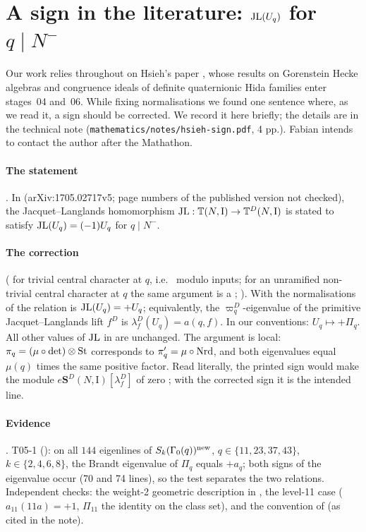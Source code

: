 \section{A sign in the literature: \texorpdfstring{$\mathrm{JL}(U_q)$}{JL(U\_q)} for \texorpdfstring{$q\mid N^-$}{q | N-}}\label{sec:hsieh}
Our work relies throughout on Hsieh's paper \cite{Hs}, whose results on Gorenstein Hecke algebras and congruence ideals of
definite quaternionic Hida families enter stages~04 and~06. While fixing normalisations we found one sentence where, as
we read it, a sign should be corrected. We record it here briefly; the details are in the technical note \cite{LLhsieh}
(\texttt{mathematics/notes/hsieh-sign.pdf}, 4 pp.). Fabian intends to contact the author after the Mathathon.

\paragraph{The statement} \stcited. In \cite[\S4.5, p.~34]{Hs} (arXiv:1705.02717v5; page numbers of the published version
not checked), the Jacquet--Langlands homomorphism $\mathrm{JL}:\mathbb{T}(N,\mathrm{I})\to\mathbb{T}^D(N,\mathrm{I})$ is stated to satisfy $\mathrm{JL}(U_q)=(-1)U_q$ for
$q\mid N^-$.

\paragraph{The correction} (\stpmc{} for trivial central character at $q$, i.e.\ \stproved{} modulo \stcited{} inputs; for an
unramified non-trivial central character at $q$ the same argument is a \stsketch; \cite[Prop.~2.1]{LLhsieh}). With the
normalisations of \cite{Hs} the relation is $\mathrm{JL}(U_q)=+U_q$; equivalently, the $\varpi^D_q$-eigenvalue of the primitive
Jacquet--Langlands lift $f^D$ is $\lambda^D_f(U_q)=a(q,f)$. In our conventions: $U_q\mapsto+\Pi_q$. All other values of $\mathrm{JL}$
in \cite[p.~34]{Hs} are unchanged. The argument is local: $\pi_q=(\mu\circ\det)\otimes\mathrm{St}$ corresponds to $\pi'_q=\mu\circ\mathrm{Nrd}$,
and both eigenvalues equal $\mu(q)$ times the same positive factor. Read literally, the printed sign would make the module
$e\mathbf{S}^D(N,\mathrm{I})[\lambda^D_f]$ of \cite[Thm~4.5]{Hs} zero \cite[Lemma~2.3]{LLhsieh}; with the corrected sign it is the intended line.

\paragraph{Evidence} \stcomp. T05-1 (): on all $144$ eigenlines of $S_k(\Gamma_0(q))^{\rm new}$,
$q\in\{11,23,37,43\}$, $k\in\{2,4,6,8\}$, the Brandt eigenvalue of $\Pi_q$ equals $+a_q$; both signs of the eigenvalue occur
(70 and 74 lines), so the test separates the two relations. Independent checks: the weight-2 geometric description in
\cite{Ri90}, the level-11 case ($a_{11}(11a)=+1$, $\Pi_{11}$ the identity on the class set), and the convention of \cite{CH15}
(as cited in the note).

